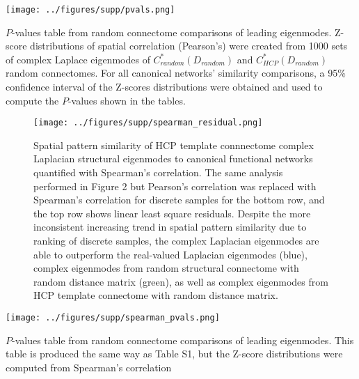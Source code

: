 \documentclass{article}
\begin{document}
\begin{table}[ht!]
\centering
\texttt{[image: ../figures/supp/pvals.png]}
\caption{$P$-values table from random connectome comparisons of leading eigenmodes. Z-score distributions of spatial correlation (Pearson's) were created from 1000 sets of complex Laplace eigenmodes of  $C_{random}^{*}(D_{random})$ and $C_{HCP}^{*}(D_{random})$ random connectomes. For all canonical networks' similarity comparisons, a 95\% confidence interval of the Z-scores distributions were obtained and used to compute the $P$-values shown in the tables.}
\end{table}


\begin{figure}[ht!]
\texttt{[image: ../figures/supp/spearman\_residual.png]}
\caption{Spatial pattern similarity of HCP template connnectome complex Laplacian structural eigenmodes to canonical functional networks quantified with Spearman's correlation. The same analysis performed in Figure 2 but Pearson's correlation was replaced with Spearman's correlation for discrete samples for the bottom row, and the top row shows linear least square residuals. Despite the more inconsistent increasing trend in spatial pattern similarity due to ranking of discrete samples, the complex Laplacian eigenmodes are able to outperform the real-valued Laplacian eigenmodes (blue), complex eigenmodes from random structural connectome with random distance matrix (green), as well as complex eigenmodes from HCP template connectome with random distance matrix.}
\label{fig:figS2}
\end{figure}

\begin{table}[ht!]
\centering
\texttt{[image: ../figures/supp/spearman\_pvals.png]}
\caption{$P$-values table from random connectome comparisons of leading eigenmodes. This table is produced the same way as Table S1, but the Z-score distributions were computed from Spearman's correlation}
\end{table}

\clearpage
\printbibliography
\end{document}
